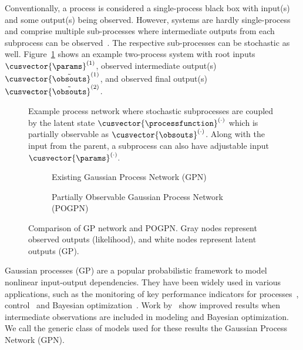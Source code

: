 Conventionally, a process is considered a single-process black box with input(s) and some output(s) being observed. However, systems are hardly single-process and comprise multiple sub-processes where intermediate outputs from each subprocess can be observed~\cite {Fenner2005Optimal}. The respective sub-processes can be stochastic as well. Figure~\ref{fig:multi_process} shows an example two-process system with root inputs $\cusvector{\params}^{(1)}$, observed intermediate output(s) $\cusvector{\tilde{\obsouts}}^{(1)}$, and observed final output(s) $\cusvector{\tilde{\obsouts}}^{(2)}$.
\begin{figure}[ht]
    \centering
    
    \vspace{-1em}
    \caption{Example process network where stochastic subprocesses are coupled by the latent state $\cusvector{\processfunction}^{(\cdot)}$ which is partially observable as $\cusvector{\obsouts}^{(\cdot)}$. Along with the input from the parent, a subprocess can also have adjustable input $\cusvector{\params}^{(\cdot)}.$}
    \vspace{-1em}
    \label{fig:multi_process}
\end{figure}
\begin{figure}[!ht]
    \centering
    \begin{subfigure}{\columnwidth}
        \centering
        
        \caption{Existing Gaussian Process Network (GPN)}
        \label{fig:toy_process_gpn}
    \end{subfigure}
    \begin{subfigure}{\columnwidth}
        \centering
        
        \caption{Partially Observable Gaussian Process Network (POGPN)}
        \label{fig:toy_process_pogpn}
    \end{subfigure}
    \caption{Comparison of GP network and POGPN. Gray nodes represent observed outputs (likelihood), and white nodes represent latent outputs (GP).}
    \vspace{-1em}
    \label{fig:gpn_pogpn_comaprison}
\end{figure}

Gaussian processes (GP) are a popular probabilistic framework to model nonlinear input-output dependencies. They have been widely used in various applications, such as the monitoring of key performance indicators for processes~\citep{Kontar2017Estimation}, control~\citep{Likar2007Predictive} and Bayesian optimization~\citep{Frazier2015Bayesian}. Work by~\cite{astudillo2021bayesian, aglietti2020causal, sussex2022model, kusakawa2022bayesian, aglietti2020multi, SakshamJPSS} show improved results when intermediate observations are included in modeling and Bayesian optimization. We call the generic class of models used for these results the Gaussian Process Network (GPN).

